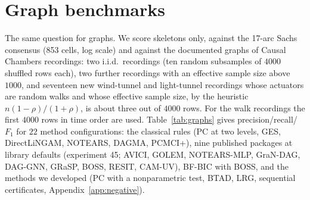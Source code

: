 \section{Graph benchmarks}\label{sec:graphs}

The same question for graphs. We score skeletons only, against the 17-arc Sachs consensus (853 cells, log scale) and against the documented graphs of Causal Chambers recordings: two i.i.d.\ recordings (ten random subsamples of $4000$ shuffled rows each), two further recordings with an effective sample size above $1000$, and seventeen new wind-tunnel and light-tunnel recordings whose actuators are random walks and whose effective sample size, by the heuristic $n(1-\rho)/(1+\rho)$, is about three out of $4000$ rows. For the walk recordings the first $4000$ rows in time order are used. Table~\ref{tab:graphs} gives precision/recall/$F_1$ for $22$ method configurations: the classical rules (PC at two levels, GES, DirectLiNGAM, NOTEARS, DAGMA, PCMCI+), nine published packages at library defaults (experiment 45; AVICI, GOLEM, NOTEARS-MLP, GraN-DAG, DAG-GNN, GRaSP, BOSS, RESIT, CAM-UV), BF-BIC with BOSS, and the methods we developed (PC with a nonparametric test, BTAD, LRG, sequential certificates, Appendix~\ref{app:negative}).

